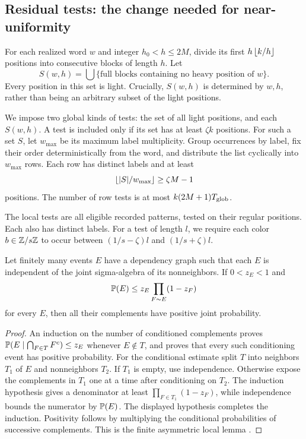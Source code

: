 \subsection{Residual tests: the change needed for near-uniformity}

For each realized word \(w\) and integer \(h_0<h\le2M\), divide its
first \(h\left\lfloor k/h\right\rfloor\) positions into consecutive blocks of length \(h\).
Let
\begin{equation}\label{eq:residual-set}
 S(w,h)=\bigcup\{\text{full blocks containing no heavy position of }w\}.
\end{equation}
Every position in this set is light. Crucially, \(S(w,h)\) is determined
by \(w,h\), rather than being an arbitrary subset of the light
positions.

We impose two global kinds of tests: the set of all light positions,
and each \(S(w,h)\). A test is included only if its set has at least
\(\zeta k\) positions. For such a set \(S\), let \(w_{\max}\) be its
maximum label multiplicity. Group occurrences by label, fix their
order deterministically from the word, and distribute the list
cyclically into \(w_{\max}\) rows.
Each row has distinct labels and at least
\begin{equation}\label{eq:row-length}
 \left\lfloor |S|/w_{\max}\right\rfloor\ge\zeta M-1
\end{equation}
positions. The number of row tests is at most
\(k(2M+1)T_{\rm glob}\).

The local tests are all eligible recorded patterns, tested on their
regular positions. Each also has distinct labels.
For a test of length \(l\), we require each color \(b\in\mathbb Z/s\mathbb Z\)
to occur between \((1/s-\zeta)l\) and \((1/s+\zeta)l\).

\begin{lemma}\label{lem:lll}
Let finitely many events \(E\) have a dependency graph such that
each \(E\) is independent of the joint sigma-algebra of its
nonneighbors. If \(0<z_E<1\) and
\[
 \mathbb P(E)\le z_E\prod_{F\sim E}(1-z_F)
\]
for every \(E\), then all their complements have positive joint
probability.
\end{lemma}

\begin{proof}
An induction on the number of conditioned complements proves
\(\mathbb P(E\mid\bigcap_{F\in T}F^c)\le z_E\) whenever \(E\notin T\),
and proves that every such conditioning event has positive probability.
For the conditional estimate split \(T\) into neighbors \(T_1\) of
\(E\) and nonneighbors \(T_2\).
If \(T_1\) is empty, use independence.
Otherwise expose the complements in \(T_1\) one at a time after
conditioning on \(T_2\). The induction hypothesis gives a denominator
at least \(\prod_{F\in T_1}(1-z_F)\), while independence bounds the
numerator by \(\mathbb P(E)\).
The displayed hypothesis completes the induction.
Positivity follows by multiplying the conditional probabilities of
successive complements. This is the finite asymmetric local lemma
\cite{erdosLovasz1975}.
\end{proof}

